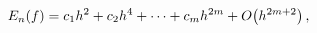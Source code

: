 \[E_{n}(f)=c_{1}h^{2}+c_{2}h^{4}+\dots+c_{m}h^{2m}+\mathop{O\/}\nolimits\!\left(%
h^{2m+2}\right),\]